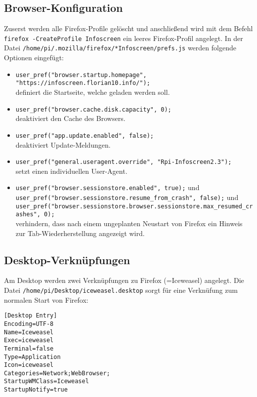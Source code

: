 \subsection{Browser-Konfiguration}
\label{sec:browserconf}
Zuserst werden alle Firefox-Profile gelöscht und anschließend wird mit dem Befehl \lstinline|firefox -CreateProfile Infoscreen| ein leeres Firefox-Profil angelegt.
In der Datei \lstinline|/home/pi/.mozilla/firefox/*Infoscreen/prefs.js| werden folgende Optionen eingefügt:\\
\begin{itemize}
	\item {\lstinline|user_pref("browser.startup.homepage", "https://infoscreen.florian10.info/");|\\
		definiert die Startseite, welche geladen werden soll.}
	\item {\lstinline|user_pref("browser.cache.disk.capacity", 0);|\\
		deaktiviert den Cache des Browsers.}
	\item {\lstinline|user_pref("app.update.enabled", false);|\\
		deaktiviert Update-Meldungen.}
	\item {\lstinline|user_pref("general.useragent.override", "Rpi-Infoscreen2.3");|\\
		setzt einen individuellen User-Agent.}
	\item {\lstinline|user_pref("browser.sessionstore.enabled", true);| und \\
		\lstinline|user_pref("browser.sessionstore.resume_from_crash", false);| und \\
		\lstinline|user_pref("browser.sessionstore.browser.sessionstore.max_resumed_crashes", 0);|\\
		verhindern, dass nach einem ungeplanten Neustart von Firefox ein Hinweis zur Tab-Wiederherstellung angezeigt wird.}
\end{itemize}

\subsection{Desktop-Verknüpfungen}
\label{sec:desktopconf}
Am Desktop werden zwei Verknüpfungen zu Firefox (=Iceweasel) angelegt.
Die Datei \lstinline|/home/pi/Desktop/iceweasel.desktop| sorgt für eine Verknüfung zum normalen Start von Firefox:\\
\begin{lstlisting}
[Desktop Entry]
Encoding=UTF-8
Name=Iceweasel
Exec=iceweasel
Terminal=false
Type=Application
Icon=iceweasel
Categories=Network;WebBrowser;
StartupWMClass=Iceweasel
StartupNotify=true
\end{lstlisting}

